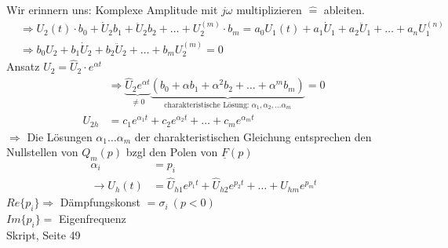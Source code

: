 Wir erinnern uns: Komplexe Amplitude mit $j\omega$ multiplizieren
$\widehat{=}$ ableiten.\\
\begin{align}
	&\Rightarrow U_2(t)\cdot b_0 + \dot{U}_2b_1 +
	\ddot{U}_2b_2+\ldots+U_2^{(m)}\cdot
	b_m=a_0U_1(t)+a_1\dot{U}_1+a_2\ddot{U}_1+\ldots+a_nU_1^{(n)}\nonumber\\
	&\Rightarrow b_0U_2+b_1\dot{U}_2+b_2\ddot{U}_2+\ldots+b_mU_2^{(m)}=0\nonumber
\end{align}
Ansatz $U_2=\hat{U}_2\cdot e^{\alpha t}$\\
\begin{align}
	&\Rightarrow \underbrace{\hat{U}_2e^{\alpha t}}_{\neq 0}\underbrace{(b_0+\alpha
b_1+\alpha^2b_2+\ldots+\alpha^mb_m)}_{\text{charakteristische
Lösung: }\alpha_1, \alpha_2, \ldots \alpha_m}=0\nonumber\\
	U_{2h}&=c_1e^{\alpha_1t}+c_2e^{\alpha_2t}+\ldots+c_me^{\alpha_mt}\nonumber
\end{align}
$\Rightarrow$ Die Lösungen $\alpha_1\ldots\alpha_m$ der charakteristischen
Gleichung entsprechen den Nullstellen von $Q_m(p)$ bzgl den Polen von
$\underline{F}(p)$\\
\begin{align}
\alpha_i&=p_i\nonumber\\
\rightarrow
U_h(t)&=\hat{U}_{h1}e^{p_1t}+\hat{U}_{h2}e^{p_2t}+\ldots+U_{hm}e^{p_mt}\nonumber
\end{align}
$Re\{p_i\} \Rightarrow $ Dämpfungskonst $=\sigma_i\ (p<0)$\\
$Im\{p_i\}=$
Eigenfrequenz\\
Skript, Seite 49\\

